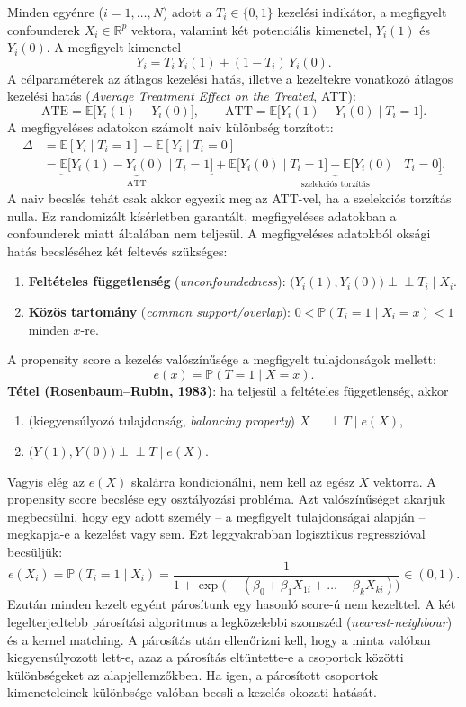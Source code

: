 \documentclass[11pt,a4paper]{article}
\newcommand{\E}{\mathbb{E}}
\newcommand{\Prob}{\mathbb{P}}
\newcommand{\indep}{\perp\!\!\!\perp}
\begin{document}
Minden egyénre ($i = 1, \dots, N$) adott a $T_i \in \{0, 1\}$ kezelési indikátor, a megfigyelt confounderek
$X_i \in \mathbb{R}^p$ vektora, valamint két potenciális kimenetel, $Y_i(1)$ és $Y_i(0)$. A megfigyelt kimenetel
\[
  Y_i = T_i\, Y_i(1) + (1 - T_i)\, Y_i(0).
\]
A célparaméterek az átlagos kezelési hatás, illetve a kezeltekre vonatkozó átlagos kezelési hatás
(\emph{Average Treatment Effect on the Treated}, ATT):
\[
  \mathrm{ATE} = \E\bigl[Y_i(1) - Y_i(0)\bigr], \qquad
  \mathrm{ATT} = \E\bigl[Y_i(1) - Y_i(0) \mid T_i = 1\bigr].
\]
A megfigyeléses adatokon számolt naiv különbség torzított:
\begin{align*}
  \Delta &= \E[Y_i \mid T_i = 1] - \E[Y_i \mid T_i = 0] \\
         &= \underbrace{\E\bigl[Y_i(1) - Y_i(0) \mid T_i = 1\bigr]}_{\text{ATT}}
          + \underbrace{\E\bigl[Y_i(0) \mid T_i = 1\bigr] - \E\bigl[Y_i(0) \mid T_i = 0\bigr]}_{\text{szelekciós torzítás}}.
\end{align*}
A naiv becslés tehát csak akkor egyezik meg az ATT-vel, ha a szelekciós torzítás nulla. Ez
randomizált kísérletben garantált, megfigyeléses adatokban a confounderek miatt általában nem
teljesül.
A megfigyeléses adatokból oksági hatás becsléséhez két feltevés szükséges:
\begin{enumerate}[nosep]
  \item \textbf{Feltételes függetlenség} (\emph{unconfoundedness}): $\bigl(Y_i(1), Y_i(0)\bigr) \indep T_i \mid X_i$.
  \item \textbf{Közös tartomány} (\emph{common support/overlap}): $0 < \Prob(T_i = 1 \mid X_i = x) < 1$ minden $x$-re.
\end{enumerate}
A propensity score a kezelés valószínűsége a megfigyelt tulajdonságok mellett:
\[
  e(x) = \Prob(T = 1 \mid X = x).
\]
\textbf{Tétel (Rosenbaum–Rubin, 1983)}: ha teljesül a feltételes függetlenség, akkor
\begin{enumerate}[nosep]
  \item (kiegyensúlyozó tulajdonság, \emph{balancing property}) $X \indep T \mid e(X)$,
  \item $\bigl(Y(1), Y(0)\bigr) \indep T \mid e(X)$.
\end{enumerate}
Vagyis elég az $e(X)$ skalárra kondicionálni, nem kell az egész $X$ vektorra.
A propensity score becslése egy osztályozási probléma. Azt  valószínűséget akarjuk megbecsülni, hogy egy adott személy – a megfigyelt tulajdonságai alapján – megkapja-e a kezelést vagy sem.
Ezt leggyakrabban logisztikus regresszióval becsüljük:
\[
  e(X_i) = \Prob(T_i = 1 \mid X_i)
  = \frac{1}{1 + \exp\bigl(-(\beta_0 + \beta_1 X_{1i} + \dots + \beta_k X_{ki})\bigr)} \in (0, 1).
\]
Ezután minden kezelt egyént párosítunk egy hasonló score-ú nem kezelttel. A két legelterjedtebb párosítási
algoritmus a legközelebbi szomszéd (\emph{nearest-neighbour}) és a kernel matching. A párosítás
után ellenőrizni kell, hogy a minta valóban kiegyensúlyozott lett-e, azaz a párosítás eltüntette-e a csoportok közötti különbségeket az alapjellemzőkben. Ha igen, a párosított csoportok
kimeneteleinek különbsége valóban becsli a kezelés okozati hatását.
\end{document}

